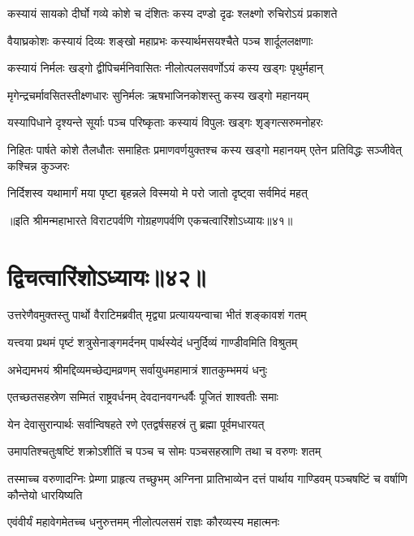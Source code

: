 \twolineshloka
{कस्यायं सायको दीर्घो गव्ये कोशे च दंशितः}
{कस्य दण्डो दृढः श्लक्ष्णो रुचिरोऽयं प्रकाशते}


\twolineshloka
{वैयाघ्रकोशः कस्यायं दिव्यः शङ्खो महाप्रभः}
{कस्यार्थमसयश्चैते पञ्च शार्दूललक्षणाः}


\twolineshloka
{कस्यायं निर्मलः खड्गो द्वीपिचर्मनिवासितः}
{नीलोत्पलसवर्णोऽयं कस्य खड्गः पृथुर्महान्}


\twolineshloka
{मृगेन्द्रचर्मावसितस्तीक्ष्णधारः सुनिर्मलः}
{ऋषभाजिनकोशस्तु कस्य खड्गो महानयम्}


\twolineshloka
{यस्यापिधाने दृश्यन्ते सूर्याः पञ्च परिष्कृताः}
{कस्यायं विपुलः खड्गः शृङ्गत्सरुमनोहरः}


\threelineshloka
{निहितः पार्षते कोशे तैलधौतः समाहितः}
{प्रमाणवर्णयुक्तश्च कस्य खड्गो महानयम्}
{एतेन प्रतिविद्धः सञ्जीवेत् कश्चिन्न कुञ्जरः}


\twolineshloka
{निर्दिशस्व यथामार्गं मया पृष्टा बृहन्नले}
{विस्मयो मे परो जातो दृष्ट्वा सर्वमिदं महत्}

॥इति श्रीमन्महाभारते विराटपर्वणि गोग्रहणपर्वणि एकचत्वारिंशोऽध्यायः॥४१॥

\chapter{द्विचत्वारिंशोऽध्यायः॥४२॥}

\twolineshloka
{उत्तरेणैवमुक्तस्तु पार्थो वैराटिमब्रवीत्}
{मृद्व्या प्रत्याययन्वाचा भीतं शङ्कावशं गतम्}




\twolineshloka
{यत्त्वया प्रथमं पृष्टं शत्रुसेनाङ्गमर्दनम्}
{पार्थस्येदं धनुर्दिव्यं गाण्डीवमिति विश्रुतम्}


\twolineshloka
{अभेद्यमभयं श्रीमद्दिव्यमच्छेद्यमव्रणम्}
{सर्वायुधमहामात्रं शातकुम्भमयं धनुः}


\twolineshloka
{एतच्छतसहस्रेण सम्मितं राष्ट्रवर्धनम्}
{देवदानवगन्धर्वैः पूजितं शाश्वतीः समाः}


\twolineshloka
{येन देवासुरान्पार्थः सर्वान्विषहते रणे}
{एतद्वर्षसहस्रं तु ब्रह्मा पूर्वमधारयत्}


\twolineshloka
{उमापतिश्चतुःषष्टिं शक्रोऽशीतिं च पञ्च च}
{सोमः पञ्चसहस्राणि तथा च वरुणः शतम्}


\threelineshloka
{तस्माच्च वरुणादग्निः प्रेम्णा प्राहृत्य तच्छुभम्}
{अग्निना प्रातिभाव्येन दत्तं पार्थाय गाण्डिवम्}
{पञ्चषष्टिं च वर्षाणि कौन्तेयो धारयिष्यति}


\twolineshloka
{एवंवीर्यं महावेगमेतच्च धनुरुत्तमम्}
{नीलोत्पलसमं राज्ञः कौरव्यस्य महात्मनः}


